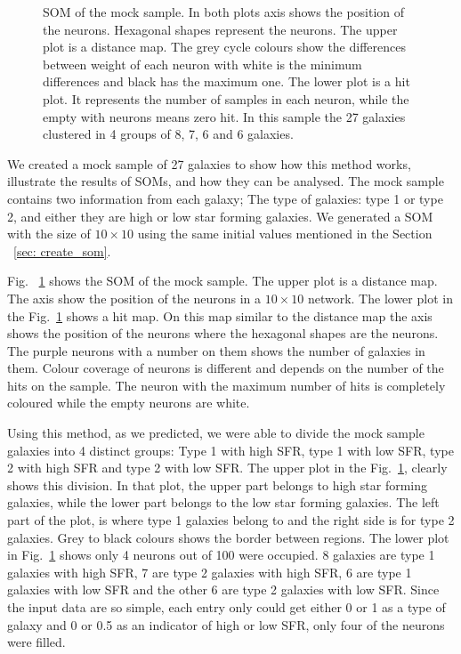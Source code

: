 \begin{figure}
\begin{subfigure}[b]{0.5\textwidth}
            \end{subfigure}
            \caption{SOM of the mock sample. In both plots axis shows the position of the neurons. Hexagonal shapes represent the neurons. The upper plot is a distance map. The grey cycle colours show the differences between weight of each neuron with white is the minimum differences and black has the maximum one. The lower plot is a hit plot. It represents the number of samples in each neuron, while the empty with neurons means zero hit. In this sample the 27 galaxies clustered in 4 groups of 8, 7, 6 and 6 galaxies.}
            \label{fig: sample}
        \end{figure}
 
 We created  a mock sample of 27 galaxies to show how this method works, illustrate the results of SOMs, and how they can be analysed.
 The mock sample contains two information from each galaxy; The type of galaxies: type 1 or type 2, and either they are high or low star forming galaxies. 
 We generated a SOM with the size of $10 \times 10$ using the same initial values mentioned in the Section ~\ref{sec: create_som}.

 Fig. ~\ref{fig: sample} shows the SOM of the mock sample. 
 The upper plot is a distance map. 
 The axis show the position of the neurons in a $10 \times 10$ network.
 The lower plot in the Fig.~\ref{fig: sample} shows a hit map.
 On this map similar to the distance map the axis shows the position of the neurons where the hexagonal shapes are the neurons.
 The purple neurons with a number on them shows the number of galaxies in them.
 Colour coverage of neurons is different and depends on the number of the hits on the sample.
 The neuron with the maximum number of hits is completely coloured while the empty neurons are white.
 
Using this method, as we predicted, we were able to divide the mock sample galaxies into 4 distinct groups: Type 1 with high SFR, type 1 with low SFR, type 2 with high SFR and type 2 with low SFR. 
The upper plot in the Fig.~\ref{fig: sample}, clearly shows this division.
In that plot, the upper part belongs to high star forming galaxies, while the lower part belongs to the low star forming galaxies.
The left part of the plot, is where type 1 galaxies belong to and the right side is for type 2 galaxies.
Grey to black colours shows the border between regions.
The lower plot in Fig.~\ref{fig: sample} shows only 4 neurons out of 100 were occupied. 
8 galaxies are type 1 galaxies with high SFR, 7 are type 2 galaxies with high SFR, 6 are type 1 galaxies with low SFR and the other 6 are type 2 galaxies with low SFR. 
Since the input data are so simple, each entry only could get either 0 or 1 as a type of galaxy and 0 or 0.5 as an indicator of  high or low SFR, only four of the neurons were filled.

